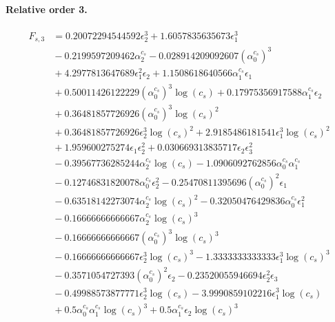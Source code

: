 \documentclass[10pt]{article}
\begin{document}
\paragraph{Relative order 3.}
\begin{align*}
F_{s,3} &= 0.20072294544592 \epsilon_{2}^{3} + 1.6057835635673 \epsilon_{1}^{3} \\
&{}  - 0.2199597209462 \alpha_{2}^{c_s} - 0.028914209092607 \left(\alpha_{0}^{c_s}\right)^{3} \\
&{}  + 4.2977813647689 \epsilon_{1}^{2} \epsilon_{2} + 1.1508618640566 \alpha_{1}^{c_s} \epsilon_{1} \\
&{}  + 0.50011426122229 \left(\alpha_{0}^{c_s}\right)^{3} \log{\left(c_{s} \right)} + 0.17975356917588 \alpha_{1}^{c_s} \epsilon_{2} \\
&{}  + 0.36481857726926 \left(\alpha_{0}^{c_s}\right)^{3} \log{\left(c_{s} \right)}^{2} \\
&{}  + 0.36481857726926 \epsilon_{2}^{3} \log{\left(c_{s} \right)}^{2} + 2.9185486181541 \epsilon_{1}^{3} \log{\left(c_{s} \right)}^{2} \\
&{}  + 1.959600275274 \epsilon_{1} \epsilon_{2}^{2} + 0.030669313835717 \epsilon_{2} \epsilon_{3}^{2} \\
&{}  - 0.39567736285244 \alpha_{2}^{c_s} \log{\left(c_{s} \right)} - 1.0906092762856 \alpha_{0}^{c_s} \alpha_{1}^{c_s} \\
&{}  - 0.12746831820078 \alpha_{0}^{c_s} \epsilon_{2}^{2} - 0.25470811395696 \left(\alpha_{0}^{c_s}\right)^{2} \epsilon_{1} \\
&{}  - 0.63518142273074 \alpha_{2}^{c_s} \log{\left(c_{s} \right)}^{2} - 0.32050476429836 \alpha_{0}^{c_s} \epsilon_{1}^{2} \\
&{}  - 0.16666666666667 \alpha_{2}^{c_s} \log{\left(c_{s} \right)}^{3} \\
&{}  - 0.16666666666667 \left(\alpha_{0}^{c_s}\right)^{3} \log{\left(c_{s} \right)}^{3} \\
&{}  - 0.16666666666667 \epsilon_{2}^{3} \log{\left(c_{s} \right)}^{3} - 1.3333333333333 \epsilon_{1}^{3} \log{\left(c_{s} \right)}^{3} \\
&{}  - 0.3571054727393 \left(\alpha_{0}^{c_s}\right)^{2} \epsilon_{2} - 0.23520055946694 \epsilon_{2}^{2} \epsilon_{3} \\
&{}  - 0.49988573877771 \epsilon_{2}^{3} \log{\left(c_{s} \right)} - 3.9990859102216 \epsilon_{1}^{3} \log{\left(c_{s} \right)} \\
&{}  + 0.5 \alpha_{0}^{c_s} \alpha_{1}^{c_s} \log{\left(c_{s} \right)}^{3} + 0.5 \alpha_{1}^{c_s} \epsilon_{2} \log{\left(c_{s} \right)}^{3} \\

\end{align*}
\end{document}
